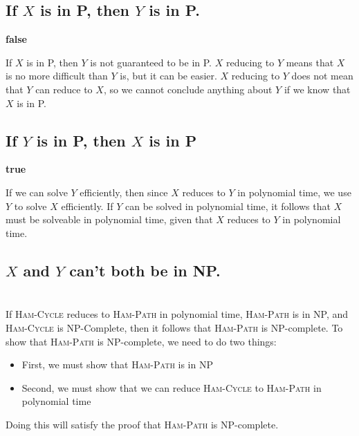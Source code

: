 \documentclass{article}
\begin{document}
\subsection{If $X$ is in P, then $Y$ is in P.}

\textbf{false}

If $X$ is in P, then $Y$ is not guaranteed to be in P.  $X$ reducing to $Y$ means that $X$ is no more difficult than $Y$ is, but it can be easier.  $X$ reducing to $Y$ does not mean that $Y$ can reduce to $X$, so we cannot conclude anything about $Y$ if we know that $X$ is in P.

\subsection{If $Y$ is in P, then $X$ is in P}

\textbf{true}

If we can solve $Y$ efficiently, then since $X$ reduces to $Y$ in polynomial time, we use $Y$ to solve $X$ efficiently.  If $Y$ can be solved in polynomial time, it follows that $X$ must be solveable in polynomial time, given that $X$ reduces to $Y$ in polynomial time.

\subsection{$X$ and $Y$ can't both be in NP.}

\section{}

If \textsc{Ham-Cycle} reduces to \textsc{Ham-Path} in polynomial time, \textsc{Ham-Path} is in NP, and \textsc{Ham-Cycle} is NP-Complete, then it follows that \textsc{Ham-Path} is NP-complete.  To show that \textsc{Ham-Path} is NP-complete, we need to do two things:

\begin{itemize}
    \item First, we must show that \textsc{Ham-Path} is in NP
    \item Second, we must show that we can reduce \textsc{Ham-Cycle} to \textsc{Ham-Path} in polynomial time
\end{itemize}

Doing this will satisfy the proof that \textsc{Ham-Path} is NP-complete.

\subsection{}
\end{document}
